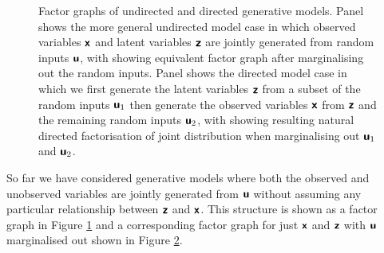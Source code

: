 \begin{figure}[!t]
\centering
\begin{subfigure}[b]{.3\linewidth}
\centering
{}
\caption{}\label{sfig:undirected-model-factor-graph}
\end{subfigure}%
\begin{subfigure}[b]{.15\linewidth}
\centering
{}
\caption{}\label{sfig:undirected-model-factor-graph-marginalised}
\end{subfigure}%
\begin{subfigure}[b]{.32\linewidth}
\centering
{}
\caption{}\label{sfig:directed-model-factor-graph}
\end{subfigure}%
\begin{subfigure}[b]{.2\linewidth}
\centering
{}
\caption{}\label{sfig:directed-model-factor-graph-marginalised}
\end{subfigure}%
\caption[Undirected and directed generative models.]{Factor graphs of undirected and directed generative models. Panel  shows the more general undirected model case in which observed variables $\boldsymbol{\mathsf{x}}$ and latent variables $\boldsymbol{\mathsf{z}}$ are jointly generated from random inputs $\boldsymbol{\mathsf{u}}$, with  showing equivalent factor graph after marginalising out the random inputs. Panel  shows the directed model case in which we first generate the latent variables $\boldsymbol{\mathsf{z}}$ from a subset of the random inputs $\boldsymbol{\mathsf{u}}_{1}$ then generate the observed variables $\boldsymbol{\mathsf{x}}$ from $\boldsymbol{\mathsf{z}}$ and the remaining random inputs $\boldsymbol{\mathsf{u}}_{2}$, with  showing resulting natural directed factorisation of joint distribution when marginalising out $\boldsymbol{\mathsf{u}}_1$ and $\boldsymbol{\mathsf{u}}_2$.}
\label{fig:directed-undirected-model-graphs}
\end{figure}

So far we have considered generative models where both the observed and unobserved variables are jointly generated from $\boldsymbol{\mathsf{u}}$ without assuming any particular relationship between $\boldsymbol{\mathsf{z}}$ and $\boldsymbol{\mathsf{x}}$. This structure is shown as a factor graph in Figure \ref{sfig:undirected-model-factor-graph} and a corresponding factor graph for just $\boldsymbol{\mathsf{x}}$ and $\boldsymbol{\mathsf{z}}$ with $\boldsymbol{\mathsf{u}}$ marginalised out shown in Figure \ref{sfig:undirected-model-factor-graph-marginalised}. 

